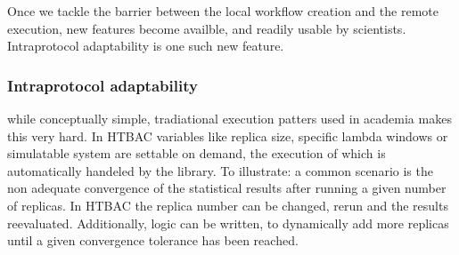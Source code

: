 Once we tackle the barrier between the local workflow creation and the remote
execution, new features become availble, and readily usable by scientists.
Intraprotocol adaptability is one such new feature.

\subsubsection{Intraprotocol adaptability}

while conceptually simple, tradiational execution patters used in academia
makes this very hard. In HTBAC variables like replica size, specific lambda
windows or simulatable system are settable on demand, the execution of which
is automatically handeled by the library. To illustrate: a common scenario is
the non adequate convergence of the statistical results after running a given
number of replicas. In HTBAC the replica number can be changed, rerun and the
results reevaluated. Additionally, logic can be written, to dynamically add
more replicas until a given convergence tolerance has been reached.
